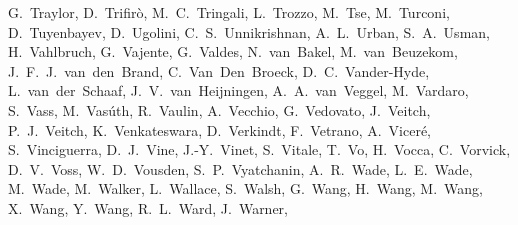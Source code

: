{G.~Traylor,  %
D.~Trifir\`o,  %
M.~C.~Tringali, %
L.~Trozzo, %
M.~Tse,  %
M.~Turconi, %
D.~Tuyenbayev,  %
D.~Ugolini,  %
C.~S.~Unnikrishnan,  %
A.~L.~Urban,  %
S.~A.~Usman,  %
H.~Vahlbruch,  %
G.~Vajente,  %
G.~Valdes,  %
N.~van~Bakel, %
M.~van~Beuzekom, %
J.~F.~J.~van~den~Brand, %
C.~Van~Den~Broeck, %
D.~C.~Vander-Hyde,  %
L.~van~der~Schaaf, %
J.~V.~van~Heijningen, %
A.~A.~van~Veggel,  %
M.~Vardaro, %
S.~Vass,  %
M.~Vas\'uth, %
R.~Vaulin,  %
A.~Vecchio,  %
G.~Vedovato, %
J.~Veitch,  %
P.~J.~Veitch,  %
K.~Venkateswara,  %
D.~Verkindt, %
F.~Vetrano, %
A.~Vicer\'e, %
S.~Vinciguerra,  %
D.~J.~Vine,  %
J.-Y.~Vinet, %
S.~Vitale, 	%
T.~Vo,  %
H.~Vocca, %
C.~Vorvick,  %
D.~V.~Voss,  %
W.~D.~Vousden,  %
S.~P.~Vyatchanin,  %
A.~R.~Wade,  %
L.~E.~Wade,  %
M.~Wade,  %
M.~Walker,  %
L.~Wallace,  %
S.~Walsh,  %
G.~Wang, %
H.~Wang,  %
M.~Wang,  %
X.~Wang,  %
Y.~Wang,  %
R.~L.~Ward,  %
J.~Warner,  %
}
